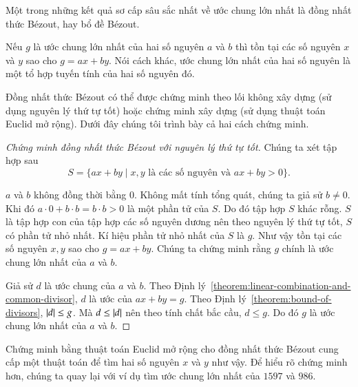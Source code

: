 Một trong những kết quả sơ cấp sâu sắc nhất về ước chung lớn nhất là đồng nhất thức B\'{e}zout, hay bổ đề B\'{e}zout.

\begin{theorem}
    Nếu $g$ là ước chung lớn nhất của hai số nguyên $a$ và $b$ thì tồn tại các số nguyên $x$ và $y$ sao cho $g = a x + b y$. Nói cách khác, ước chung lớn nhất của hai số nguyên là một tổ hợp tuyến tính của hai số nguyên đó.
\end{theorem}

Đồng nhất thức B\'{e}zout có thể được chứng minh theo lối không xây dựng (sử dụng nguyên lý thứ tự tốt) hoặc chứng minh xây dựng (sử dụng thuật toán Euclid mở rộng). Dưới đây chúng tôi trình bày cả hai cách chứng minh.

\begin{proof}[Chứng minh đồng nhất thức B\'{e}zout với nguyên lý thứ tự tốt]
    Chúng ta xét tập hợp sau
    \[
        S = \{ a x + b y \mid \text{$x, y$ là các số nguyên và $a x + b y > 0$} \}.
    \]

    $a$ và $b$ không đồng thời bằng $0$. Không mất tính tổng quát, chúng ta giả sử $b\ne 0$. Khi đó $a\cdot 0 + b\cdot b = b\cdot b > 0$ là một phần tử của $S$. Do đó tập hợp $S$ khác rỗng. $S$ là tập hợp con của tập hợp các số nguyên dương nên theo nguyên lý thứ tự tốt, $S$ có phần tử nhỏ nhất. Kí hiệu phần tử nhỏ nhất của $S$ là $g$. Như vậy tồn tại các số nguyên $x, y$ sao cho $g = a x + b y$. Chúng ta chứng minh rằng $g$ chính là ước chung lớn nhất của $a$ và $b$.

    Giả sử $d$ là ước chung của $a$ và $b$. Theo Định lý~\ref{theorem:linear-combination-and-common-divisor}, $d$ là ước của $a x + b y = g$. Theo Định lý~\ref{theorem:bound-of-divisors}, $\left\vert{d}\right\vert\leq g$. Mà $d\leq \left\vert{d}\right\vert$ nên theo tính chất bắc cầu, $d\leq g$. Do đó $g$ là ước chung lớn nhất của $a$ và $b$.
\end{proof}

Chứng minh bằng thuật toán Euclid mở rộng cho đồng nhất thức B\'{e}zout cung cấp một thuật toán để tìm hai số nguyên $x$ và $y$ như vậy. Để hiểu rõ chứng minh hơn, chúng ta quay lại với ví dụ tìm ước chung lớn nhất của $1597$ và $986$.

